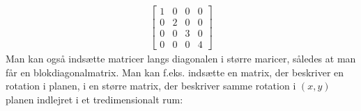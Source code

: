 \documentclass[letterpaper,10pt,english]{jupyterBook}
\begin{document}
\begin{sphinxVerbatim}[commandchars=\\\{\}]
   

     
\end{sphinxVerbatim}
\begin{equation*}
\begin{split}\displaystyle \left[\begin{matrix}1 & 0 & 0 & 0\\0 & 2 & 0 & 0\\0 & 0 & 3 & 0\\0 & 0 & 0 & 4\end{matrix}\right]\end{split}
\end{equation*}
Man kan også indsætte matricer langs diagonalen i større maricer, således at man får en blok\sphinxhyphen{}diagonal\sphinxhyphen{}matrix. Man kan f.eks. indsætte en matrix, der beskriver en rotation i planen, i en større matrix, der beskriver samme rotation i \((x,y)\)\sphinxhyphen{}planen indlejret i et tredimensionalt rum:
\end{document}
